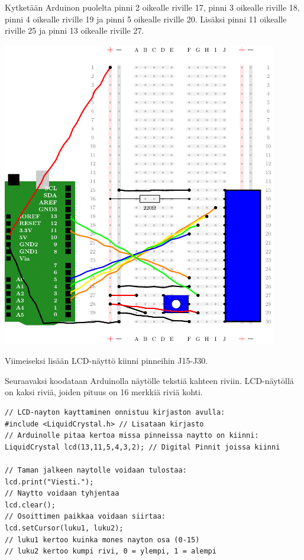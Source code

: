Kytketään Arduinon puolelta pinni 2 oikealle riville 17, pinni 3 oikealle riville 18, pinni 4 oikealle riville 19 ja pinni 5 oikealle riville 20. Lisäksi pinni 11 oikealle riville 25 ja pinni 13 oikealle riville 27. 


\includegraphics[width=0.9\textwidth]{kuvat/kuva23.pdf} \label{fig:lcd}

Viimeiseksi lisään LCD-näyttö kiinni pinneihin J15-J30.

\clearpage
Seuraavaksi koodataan Arduinolla näytölle tekstiä kahteen riviin. LCD-näytöllä on kaksi riviä, joiden pituus on 16 merkkiä riviä kohti. 

\begin{tcolorbox}[colback=white,title=Vinkkejä Arduinolla koodaamiseen!,colbacktitle=purple!90]
\begin{lstlisting}
// LCD-nayton kayttaminen onnistuu kirjaston avulla:
#include <LiquidCrystal.h> // Lisataan kirjasto 
// Arduinolle pitaa kertoa missa pinneissa naytto on kiinni:
LiquidCrystal lcd(13,11,5,4,3,2); // Digital Pinnit joissa kiinni

// Taman jalkeen naytolle voidaan tulostaa:
lcd.print("Viesti.");
// Naytto voidaan tyhjentaa
lcd.clear();
// Osoittimen paikkaa voidaan siirtaa:
lcd.setCursor(luku1, luku2);
// luku1 kertoo kuinka mones nayton osa (0-15)
// luku2 kertoo kumpi rivi, 0 = ylempi, 1 = alempi
\end{lstlisting}
\end{tcolorbox}

